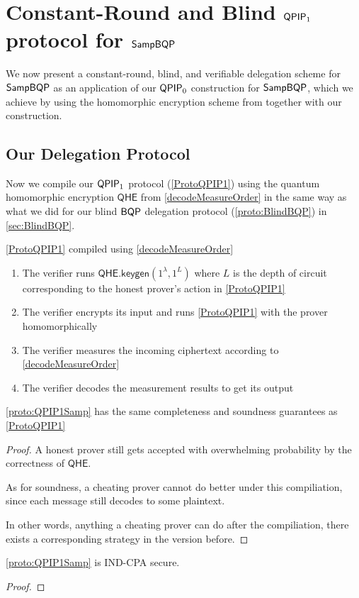 \section{Constant-Round and Blind $\operatorname{\mathsf{QPIP}}_1$ protocol for $\operatorname{\mathsf{SampBQP}}$}

We now present a constant-round, blind, and verifiable delegation scheme for $\operatorname{\mathsf{SampBQP}}$ as an application of our $\operatorname{\mathsf{QPIP}}_0$ construction for $\operatorname{\mathsf{SampBQP}}$,
which we achieve by using the homomorphic encryption scheme from \cite{mahadev_qfhe} together with our construction.

\subsection{Our Delegation Protocol}

Now we compile our $\operatorname{\mathsf{QPIP}}_1$ protocol (\cref{ProtoQPIP1}) using the quantum homomorphic encryption $\mathsf{QHE}$ from \cref{decodeMeasureOrder} in the same way as what we did for our blind $\operatorname{\mathsf{BQP}}$ delegation protocol (\cref{proto:BlindBQP}) in \cref{sec:BlindBQP}.

\begin{protocol}{\cref{ProtoQPIP1} compiled using \cref{decodeMeasureOrder}}
	\label{proto:QPIP1Samp}
	\begin{enumerate}
		\item The verifier runs $\mathsf{QHE.keygen}(1^\lambda, 1^L)$ where $L$ is the depth of circuit corresponding to the honest prover's action in \cref{ProtoQPIP1}
		\item The verifier encrypts its input and runs \cref{ProtoQPIP1} with the prover homomorphically
		\item The verifier measures the incoming ciphertext according to \cref{decodeMeasureOrder}
		\item The verifier decodes the measurement results to get its output
	\end{enumerate}
\end{protocol}

\begin{thm}
	\cref{proto:QPIP1Samp} has the same completeness and soundness guarantees as \cref{ProtoQPIP1}
\end{thm}
\begin{proof}
	A honest prover still gets accepted with overwhelming probability by the correctness of $\mathsf{QHE}$. 

	As for soundness, a cheating prover cannot do better under this compiliation, since each message still decodes to some plaintext.

	In other words, anything a cheating prover can do after the compiliation, there exists a corresponding strategy in the version before.
\end{proof}

\begin{thm}
	\cref{proto:QPIP1Samp} is IND-CPA secure.
\end{thm}
\begin{proof}
\end{proof}
